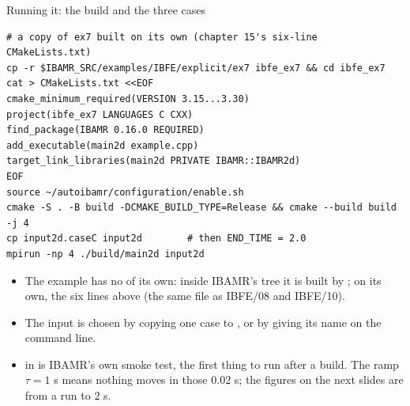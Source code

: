 \documentclass[aspectratio=169,11pt]{beamer}
\begin{document}
\begin{frame}[fragile]{Running it: the build and the three cases}
\label{fr:run}
\footnotesize
\begin{lstlisting}[style=shell]
# a copy of ex7 built on its own (chapter 15's six-line CMakeLists.txt)
cp -r $IBAMR_SRC/examples/IBFE/explicit/ex7 ibfe_ex7 && cd ibfe_ex7
cat > CMakeLists.txt <<EOF
cmake_minimum_required(VERSION 3.15...3.30)
project(ibfe_ex7 LANGUAGES C CXX)
find_package(IBAMR 0.16.0 REQUIRED)
add_executable(main2d example.cpp)
target_link_libraries(main2d PRIVATE IBAMR::IBAMR2d)
EOF
source ~/autoibamr/configuration/enable.sh
cmake -S . -B build -DCMAKE_BUILD_TYPE=Release && cmake --build build -j 4
cp input2d.caseC input2d        # then END_TIME = 2.0
mpirun -np 4 ./build/main2d input2d
\end{lstlisting}
\begin{itemize}
  \item The example has no  of its own: inside IBAMR's tree it is built by ; on its own, the six lines above (the same file as IBFE/08 and IBFE/10).
  \item The input is chosen by copying one case to , or by giving its name on the command line.
  \item {} in  is IBAMR's own smoke test, the first thing to run after a build. The ramp $\tau = 1$ s means nothing moves in those $0.02$ s; the figures on the next slides are from a run to $2$ s.
\end{itemize}
\end{frame}
\end{document}

